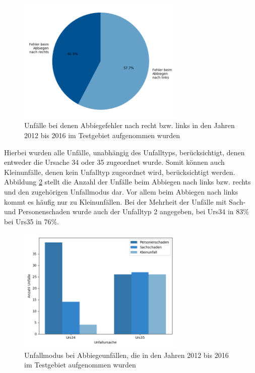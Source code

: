 \begin{savenotes}
	\begin{figure}[H]
		\centering
		\includegraphics[width=8cm,height=6cm]{figures/These_1}
		\caption[Unfälle bei denen Abbiegefehler nach recht bzw. links in den Jahren 2012 bis 2016 im Testgebiet aufgenommen wurden]{Unfälle bei denen Abbiegefehler nach recht bzw. links in den Jahren 2012 bis 2016 im Testgebiet aufgenommen wurden}\label{fig:Abbiegen_rechts_links}
	\end{figure}
\end{savenotes}

Hierbei wurden alle Unfälle, unabhängig des Unfalltyps, berücksichtigt, denen entweder die Ursache 34 oder 35 zugeordnet wurde. Somit können auch Kleinunfälle, denen kein Unfalltyp zugeordnet wird, berücksichtigt werden. Abbildung \ref{fig:Abbiegen_Md} stellt die Anzahl der Unfälle beim Abbiegen nach links bzw. rechts und den zugehörigen Unfallmodus dar. Vor allem beim Abbiegen nach links kommt es häufig nur zu Kleinunfällen.
Bei der Mehrheit der Unfälle mit Sach- und Personenschaden wurde auch der Unfalltyp 2 angegeben, bei Urs34 in 83\% bei Urs35 in 76\%.

\begin{savenotes}
	\begin{figure}[H]
		\centering
		\includegraphics[width=8cm,height=6cm]{figures/Abbiegen_Md}
		\caption[Unfallmodus bei Abbiegeunfällen, die in den Jahren 2012 bis 2016 im Testgebiet aufgenommen wurden]{Unfallmodus bei Abbiegeunfällen, die in den Jahren 2012 bis 2016 im Testgebiet aufgenommen wurden}\label{fig:Abbiegen_Md}
	\end{figure}
\end{savenotes}

